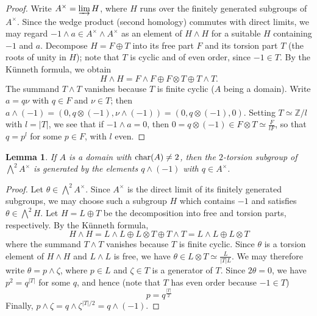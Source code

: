 \documentclass[11pt]{amsart}
\theoremstyle{definition}
\theoremstyle{plain}
\newtheorem{lem}[ntn]{Lemma}
\numberwithin{equation}{section}
\newcommand{\z}{\mathbb{Z}}
\renewcommand{\aa}{{A^\times}}
\newcommand{\lan}{\langle}
\newcommand{\ran}{\rangle}
\renewcommand{\char}{{\rm char}}
\begin{document}
\begin{proof}
    Write $\aa=\varinjlim H$, where $H$ runs over the finitely generated subgroups of $\aa$. Since the wedge product (second homology) commutes with direct limits, we may regard $-1\wedge a\in \aa\wedge \aa$ as an element of $H\wedge H$ for a suitable $H$ containing $-1$ and $a$. Decompose $H=F\oplus T$ into its free part $F$ and its torsion part $T$ (the roots of unity in $H$); note that $T$ is cyclic and of even order, since $-1\in T$. By the K\"unneth formula, we obtain
    \[
        H\wedge H=F\wedge F\oplus F\otimes T\oplus T\wedge T.
    \]
    The summand $T\wedge T$ vanishes because $T$ is finite cyclic ($A$ being a domain). Write $a=q\nu$ with $q\in F$ and $\nu\in T$; then $a\wedge (-1)=(0,q\otimes(-1),\nu\wedge (-1))=(0,q\otimes(-1),0)$. Setting $T\simeq \z/l$ with $l=|T|$, we see that if $-1\wedge a=0$, then $\displaystyle 0=q\otimes(-1)\in F\otimes T\simeq\frac{F}{lF}$, so that $q=p^l$ for some $p\in F$, with $l$ even. %
\end{proof}
\begin{lem}
    \label{ker-wed-2}
    If $A$ is a domain with $\char(A)\neq 2$, then the $2$-torsion subgroup of $\bigwedge^2\aa$ is generated by the elements $q\wedge (-1)$ with $q\in\aa$.
\end{lem}
\begin{proof}
    Let $\theta\in\bigwedge^2\aa$. Since $\aa$ is the direct limit of its finitely generated subgroups, we may choose such a subgroup $H$ which contains $-1$ and satisfies $\theta\in\bigwedge^2H$. Let $H=L\oplus T$ be the decomposition into free and torsion parts, respectively. By the K\"unneth formula,
    \[
        H\wedge H=L\wedge L\oplus L\otimes T\oplus T\wedge T=L\wedge L\oplus L\otimes T
    \]
    where the summand $T\wedge T$ vanishes because $T$ is finite cyclic. Since $\theta$ is a torsion element of $H\wedge H$ and $L\wedge L$ is free, we have $\displaystyle\theta\in L\otimes T\simeq \frac{L}{|T|L}$. We may therefore write $\theta=p\wedge\zeta$, where $p\in L$ and $\zeta\in T$ is a generator of $T$. Since $2\theta=0$, we have $p^2=q^{|T|}$ for some $q$, and hence (note that $T$ has even order because $-1\in T$)
    \[
        p=q^{\frac{|T|}{2}}
    \]
    Finally, $p\wedge\zeta=q\wedge\zeta^{|T|/2}=q\wedge(-1)$.
\end{proof}
\end{document}
